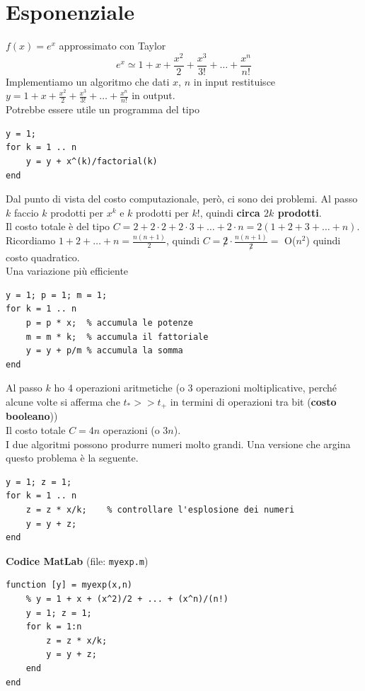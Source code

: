 \documentclass[10pt]{book}
\begin{document}
\section{Esponenziale}
$f(x) = e^x$ approssimato con Taylor $$e^x \simeq 1 + x + \frac{x^2}{2} + \frac{x^3}{3!} + \ldots + \frac{x^n}{n!}$$ Implementiamo un algoritmo che dati $x$, $n$ in input restituisce $y = 1 + x + \frac{x^2}{2} + \frac{x^3}{3!} + \ldots + \frac{x^n}{n!}$ in output.\\
Potrebbe essere utile un programma del tipo
\begin{lstlisting}
y = 1;
for k = 1 .. n
	y = y + x^(k)/factorial(k)
end
\end{lstlisting}
Dal punto di vista del costo computazionale, però, ci sono dei problemi. Al passo $k$ faccio $k$ prodotti per $x^k$ e $k$ prodotti per $k!$, quindi \textbf{circa $2k$ prodotti}.\\
Il costo totale è del tipo $C = 2 + 2\cdot 2 + 2\cdot 3 + \ldots + 2\cdot n = 2(1 + 2 + 3 + \ldots + n)$.\\
Ricordiamo $1 + 2 + \ldots + n = \frac{n(n + 1)}{2}$, quindi $C = \not 2\cdot\frac{n(n+1)}{\not 2} =$ O($n^2$) quindi costo quadratico.\\
Una variazione più efficiente
\begin{lstlisting}
y = 1; p = 1; m = 1;
for k = 1 .. n
	p = p * x;	% accumula le potenze
	m = m * k;	% accumula il fattoriale
	y = y + p/m	% accumula la somma
end
\end{lstlisting}
Al passo $k$ ho 4 operazioni aritmetiche (o 3 operazioni moltiplicative, perché alcune volte si afferma che $t_* >> t_+$ in termini di operazioni tra bit (\textbf{costo booleano}))\\
Il costo totale $C = 4n$ operazioni (o $3n$).\\
I due algoritmi possono produrre numeri molto grandi. Una versione che argina questo problema è la seguente.
\begin{lstlisting}
y = 1; z = 1;
for k = 1 .. n
	z = z * x/k;	% controllare l'esplosione dei numeri
	y = y + z;
end
\end{lstlisting}
\begin{center}
\pagebreak
\textbf{Codice MatLab} (file: \texttt{myexp.m})
\begin{lstlisting}
function [y] = myexp(x,n)
    % y = 1 + x + (x^2)/2 + ... + (x^n)/(n!)
    y = 1; z = 1;
    for k = 1:n
        z = z * x/k;
        y = y + z;
    end
end
\end{lstlisting}
\end{center}
\end{document}
